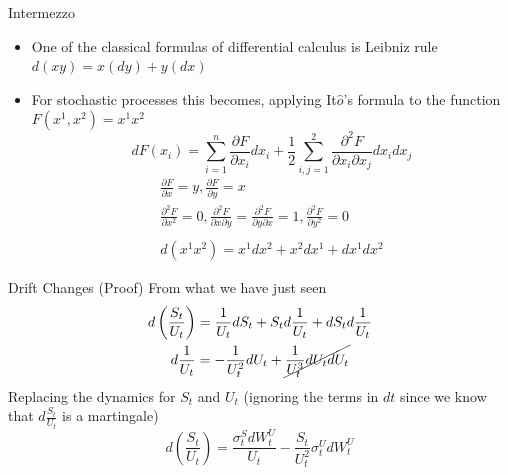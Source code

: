 \documentclass{beamer}
\begin{document}
\begin{frame}{Intermezzo}
\begin{itemize}
\item One of the classical formulas of differential calculus is Leibniz rule $d(x y) = x(dy) + y(dx)$
\item For stochastic processes this becomes, applying It$\hat{o}$'s formula to the function $F(x^1,x^2) = x^1x^2$
\begin{equation*}
dF(x_i)=\sum_{i=1}^n \frac{\partial F}{\partial x_i}dx_i
+\frac{1}{2}\sum_{i,j=1}^2 \frac{\partial^2 F}{\partial x_i \partial x_j}dx_i dx_j
\end{equation*}
\begin{equation*}
\begin{gathered}
\frac{\partial F}{\partial x}=y,\frac{\partial F}{\partial y}=x \\
\frac{\partial^2 F}{\partial x^2}=0,\frac{\partial^2 F}{\partial x\partial y}=\frac{\partial^2 F}{\partial y\partial x}=1,\frac{\partial^2 F}{\partial y^2}=0\\
\\
d(x^1 x^2) = x^1dx^2 + x^2dx^1 + dx^1dx^2
\end{gathered}
\end{equation*}
\end{itemize}
\end{frame}

\begin{frame}{Drift Changes (Proof)}	
	From what we have just seen
	\begin{equation*}
		\begin{gathered}
		d\left(\frac{S_t}{U_t}\right)=\frac{1}{U_t}dS_t+S_td\frac{1}{U_t}+dS_td\frac{1}{U_t} \\
		d\frac{1}{U_t}=-\frac{1}{U^2_t}dU_t+\cancel{\frac{1}{U^3_t}dU_tdU_t}
		\end{gathered}
	\end{equation*}
	Replacing the dynamics for $S_t$ and $U_t$ (ignoring the terms in $dt$ since we know that $d\frac{S_t}{U_t}$ is a martingale)
	\begin{equation}
		d\left(\frac{S_t}{U_t}\right) = \frac{\sigma^S_t dW^U_t}{U_t} - \frac{S_t}{U^2_t}\sigma^U_t dW^U_t
	\end{equation}
\end{frame}
   
\end{document}

